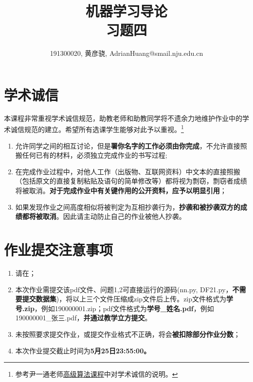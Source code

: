 \documentclass[a4paper,UTF8]{article}
\theoremstyle{definition}
\begin{document}
\title{机器学习导论\\
	习题四}
\author{191300020, 黄彦骁, AdrianHuang@smail.nju.edu.cn}
\maketitle


\section*{学术诚信}

本课程非常重视学术诚信规范，助教老师和助教同学将不遗余力地维护作业中的学术诚信规范的建立。希望所有选课学生能够对此予以重视。\footnote{参考尹一通老师\href{http://tcs.nju.edu.cn/wiki/}{高级算法课程}中对学术诚信的说明。}

\begin{tcolorbox}
	\begin{enumerate}
		\item[(1)] 允许同学之间的相互讨论，但是{\color{red}\textbf{署你名字的工作必须由你完成}}，不允许直接照搬任何已有的材料，必须独立完成作业的书写过程;
		\item[(2)] 在完成作业过程中，对他人工作（出版物、互联网资料）中文本的直接照搬（包括原文的直接复制粘贴及语句的简单修改等）都将视为剽窃，剽窃者成绩将被取消。{\color{red}\textbf{对于完成作业中有关键作用的公开资料，应予以明显引用}}；
		\item[(3)] 如果发现作业之间高度相似将被判定为互相抄袭行为，{\color{red}\textbf{抄袭和被抄袭双方的成绩都将被取消}}。因此请主动防止自己的作业被他人抄袭。
	\end{enumerate}
\end{tcolorbox}

\section*{作业提交注意事项}
\begin{tcolorbox}
	\begin{enumerate}
		\item[(1)] 请在；
		\item[(2)] 本次作业需提交该pdf文件、问题1,2可直接运行的源码(nn.py, DF21.py，{\color{red}\textbf{不需要提交数据集}})，将以上三个文件压缩成zip文件后上传。zip文件格式为{\color{red}\textbf{学号.zip}}，例如190000001.zip；pdf文件格式为{\color{red}\textbf{学号\_姓名.pdf}}，例如190000001\_张三.pdf，{\color{red}\textbf{并通过教学立方提交}}。
		\item[(3)] 未按照要求提交作业，或提交作业格式不正确，将会{\color{red}\textbf{被扣除部分作业分数}}；
		\item[(4)] 本次作业提交截止时间为{\color{red}\textbf{5月25日23:55:00。}}
	\end{enumerate}
\end{tcolorbox}
\end{document}
